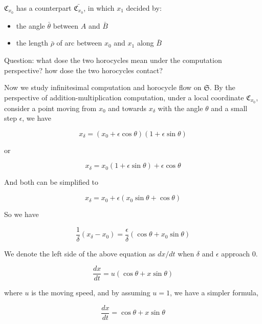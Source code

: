 \documentclass{article}
\begin{document}
$\mathfrak{C}_{x_0}$ has a counterpart $\bar{\mathfrak{C}_{x_0}}$, in which $x_1$ decided by:
\begin{itemize}
    \item the angle $\bar{\theta}$ between $A$ and $\bar{B}$
    \item the length $\bar{\rho}$ of arc between $x_0$ and $x_1$ along $\bar{B}$
\end{itemize}

Question: what dose the two horocycles mean under the computation perspective? how dose the two horocycles contact?

Now we study infinitesimal computation and horocycle flow on $\mathfrak{S}$. By the perspective of
addition-multiplication computation, under a local coordinate $\mathfrak{C}_{x_0}$,
consider a point moving from $x_0$ and towards $x_{\delta}$ with the angle $\theta$ and a small step $\epsilon$, we have

\begin{equation}
    x_{\delta} = (x_0 + \epsilon \cos \theta)(1 + \epsilon \sin \theta)
\end{equation}

or

\begin{equation}
    x_{\delta} = x_0 (1 + \epsilon \sin \theta) + \epsilon \cos \theta
\end{equation}

And both can be simplified to

\begin{equation}
    x_{\delta} = x_0 + \epsilon (x_0 \sin \theta + \cos \theta)
\end{equation}

So we have

\begin{equation}
    \frac{1}{\delta} (x_{\delta} - x_0) = \frac{\epsilon}{\delta} (\cos \theta + x_0 \sin \theta)
\end{equation}

We denote the left side of the above equation as $dx / dt$ when $\delta$ and $\epsilon$ approach 0.

\begin{equation}
    \frac{dx}{dt} = u (\cos \theta + x \sin \theta)
\end{equation}

where $u$ is the moving speed, and by assuming $u = 1$, we have a simpler formula,

\begin{equation}
    \frac{dx}{dt} = \cos \theta + x \sin \theta
\end{equation}
\end{document}
